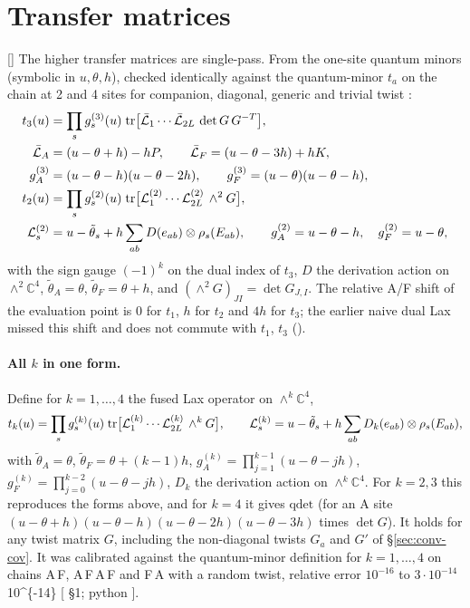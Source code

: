 \section{Transfer matrices}\label{sec:tm}

[] The higher transfer matrices are single-pass. From the one-site quantum minors (symbolic in
$u,\theta,h$), checked identically against the quantum-minor $t_a$ on the chain at 2 and 4 sites for companion, diagonal,
generic and trivial twist \ex:
\begin{align}
 t_3(u)&=\prod_sg^{(3)}_s(u)\;\mathrm{tr}\big[\bar{\mathcal L}_1\cdots\bar{\mathcal L}_{2L}\,\det G\,G^{-T}\big],\\
 \bar{\mathcal L}_A&=(u-\theta+h)-hP,\qquad \bar{\mathcal L}_F=(u-\theta-3h)+hK,\nonumber\\
 g^{(3)}_A&=(u-\theta-h)(u-\theta-2h),\qquad g^{(3)}_F=(u-\theta)(u-\theta-h),\nonumber\\
 t_2(u)&=\prod_sg^{(2)}_s(u)\;\mathrm{tr}\big[\mathcal L^{(2)}_1\cdots\mathcal L^{(2)}_{2L}\,\wedge^2G\big],\\
 \mathcal L^{(2)}_s&=u-\tilde\theta_s+h\sum_{ab}D(e_{ab})\otimes\rho_s(E_{ab}),\qquad
 g^{(2)}_A=u-\theta-h,\quad g^{(2)}_F=u-\theta,\nonumber
\end{align}
with the sign gauge $(-1)^k$ on the dual index of $t_3$, $D$ the derivation action on $\wedge^2\mathbb C^4$,
$\tilde\theta_A=\theta$, $\tilde\theta_F=\theta+h$, and $(\wedge^2G)_{JI}=\det G_{J,I}$. The relative A/F shift of the
evaluation point is $0$ for $t_1$, $h$ for $t_2$ and $4h$ for $t_3$; the earlier naive dual Lax missed this shift and does
not commute with $t_1$, $t_3$ ().

\paragraph{All $k$ in one form.} Define for $k=1,\dots,4$ the fused Lax operator on $\wedge^k\mathbb C^4$,
\begin{equation}
 t_k(u)=\prod_sg^{(k)}_s(u)\;\mathrm{tr}\big[\mathcal L^{(k)}_1\cdots\mathcal L^{(k)}_{2L}\,\wedge^kG\big],\qquad
 \mathcal L^{(k)}_s=u-\tilde\theta_s+h\sum_{ab}D_k(e_{ab})\otimes\rho_s(E_{ab}),
\end{equation}
with $\tilde\theta_A=\theta$, $\tilde\theta_F=\theta+(k-1)h$, $g^{(k)}_A=\prod_{j=1}^{k-1}(u-\theta-jh)$,
$g^{(k)}_F=\prod_{j=0}^{k-2}(u-\theta-jh)$, $D_k$ the derivation action on $\wedge^k\mathbb C^4$. For $k=2,3$ this reproduces
the forms above, and for $k=4$ it gives $\mathrm{qdet}$ (for an A site
$(u-\theta+h)(u-\theta-h)(u-\theta-2h)(u-\theta-3h)$ times $\det G$). It holds for any twist matrix $G$, including the
non-diagonal twists $G_a$ and $G'$ of \S\ref{sec:conv-cov}. It was calibrated against the quantum-minor definition for
$k=1,\dots,4$ on chains A\,F, A\,F\,A\,F and F\,A with a random twist, relative error $10^{-16}$ to $3\cdot10^{-14}$
\num{10^{-14}} [ \S1; python ].

